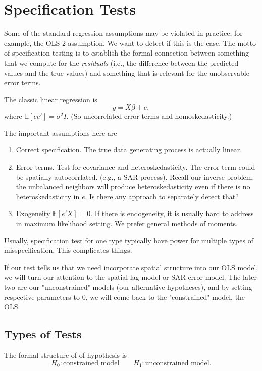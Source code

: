 \documentclass[11pt,a4paper]{amsart}
\theoremstyle{plain}
\theoremstyle{definition}
\begin{document}
\section{Specification Tests}\hfill\par 
Some of the standard regression assumptions may be violated in practice, for example, the OLS $2$ assumption. We want to detect if this is the case. The motto of specification testing is to establish the formal connection between something that we compute for the \textit{residuals} (i.e., the difference between the predicted values and the true values) and something that is relevant for the unobservable error terms. 

The classic linear regression is 
\[	y = X \beta + e,	\]
where $\mathbb{E}[ee'] = \sigma^{2}I$. (So uncorrelated error terms and homoskedasticity.)

The important assumptions here are
\begin{enumerate}
	\item Correct specification. The true data generating process is actually linear.
	\item Error terms. Test for covariance and heteroskedasticity. The error term could be spatially autocorrlated. (e.g., a SAR process).  Recall our inverse problem: the unbalanced neighbors will produce heteroskedasticity even if there is no heteroskedasticity in $e$. Is there any approach to separately detect that?
	\item  Exogeneity $\mathbb{E}[e'X] = 0$. If there is endogeneity, it is usually hard to address in maximum likelihood setting. We prefer general methods of moments.
\end{enumerate}

Usually, specification test for one type typically have power for multiple types of misspecification. This complicates things. 

If our test tells us that we need incorporate spatial structure into our OLS model, we will turn our attention to the spatial lag model or SAR error model. The later two are our "unconstrained" models (our alternative hypotheses), and by setting respective parameters to $0$, we will come back to the "constrained" model, the OLS. 

\subsection{Types of Tests}\hfill\par 
The formal structure of of hypothesis is 
\[	H_{0}: \text{constrained model} \qquad H_{1}: \text{unconstrained model}.	\]
\end{document}
